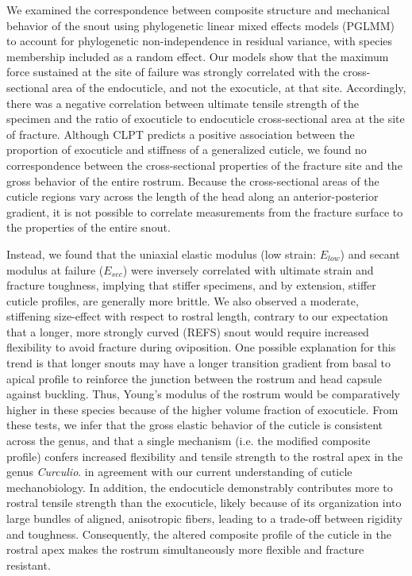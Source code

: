 \documentclass[twocolumn, linenumbers, superscriptaddress, nofootinbib]{revtex4-1}
\begin{document}
		We examined the correspondence between composite structure and mechanical behavior of the snout using phylogenetic linear mixed effects models (PGLMM) to account for phylogenetic non-independence in residual variance, with species membership included as a random effect.
		Our models show that the maximum force sustained at the site of failure was strongly correlated with the cross-sectional area of the endocuticle, and not the exocuticle, at that site.
		Accordingly, there was a negative correlation between ultimate tensile strength of the specimen and the ratio of exocuticle to endocuticle cross-sectional area at the site of fracture.
		Although CLPT predicts a positive association between the proportion of exocuticle and stiffness of a generalized cuticle, we found no correspondence between the cross-sectional properties of the fracture site and the gross behavior of the entire rostrum.
		Because the cross-sectional areas of the cuticle regions vary across the length of the head along an anterior-posterior gradient, it is not possible to correlate measurements from the fracture surface to the properties of the entire snout.
		
		Instead, we found that the uniaxial elastic modulus (low strain: $E_{low}$) and secant modulus at failure ($E_{sec}$) were inversely correlated with ultimate strain and fracture toughness, implying that stiffer specimens, and by extension, stiffer cuticle profiles, are generally more brittle.
		We also observed a moderate, stiffening size-effect with respect to rostral length, contrary to our expectation that a longer, more strongly curved (REFS) snout would require increased flexibility to avoid fracture during oviposition.
		One possible explanation for this trend is that longer snouts may have a longer transition gradient from basal to apical profile to reinforce the junction between the rostrum and head capsule against buckling.
		Thus, Young's modulus of the rostrum would be comparatively higher in these species because of the higher volume fraction of exocuticle.
		From these tests, we infer that the gross elastic behavior of the cuticle is consistent across the genus, and that a single mechanism (i.e. the modified composite profile) confers increased flexibility and tensile strength to the rostral apex in the genus \textit{Curculio}.
		in agreement with our current understanding of cuticle mechanobiology.
		In addition, the endocuticle demonstrably contributes more to rostral tensile strength than the exocuticle, likely because of its organization into large bundles of aligned, anisotropic fibers, leading to a trade-off between rigidity and toughness.
		Consequently, the altered composite profile of the cuticle in the rostral apex makes the rostrum simultaneously more flexible and fracture resistant.
	
\end{document}

